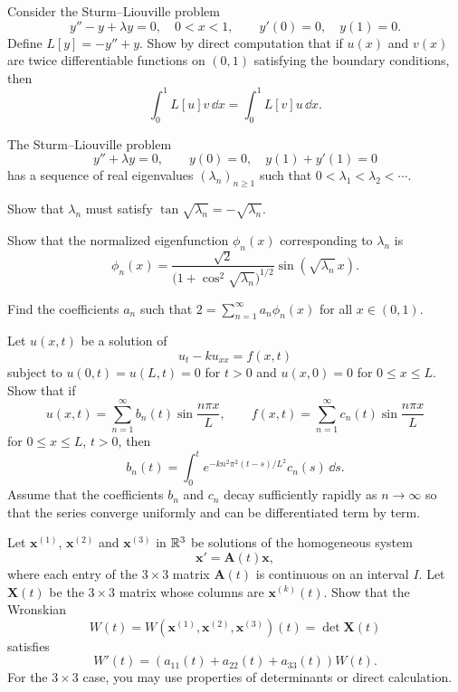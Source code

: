 \documentclass[11pt,oneside]{article}
\begin{document}
\begin{problem}
Consider the Sturm--Liouville problem
\[y''-y+\lambda y=0,\quad 0<x<1,\qquad y'(0)=0,\quad y(1)=0.\]
Define $L[y]=-y''+y$. Show by direct computation that if $u(x)$ and $v(x)$ are twice differentiable functions on $(0,1)$ satisfying the boundary conditions, then
\[\int_0^1 L[u]v\,\dd x=\int_0^1 L[v]u\,\dd x.\]
\end{problem}

\begin{problem}
The Sturm--Liouville problem
\[y''+\lambda y=0,\qquad y(0)=0,\quad y(1)+y'(1)=0\]
has a sequence of real eigenvalues $(\lambda_n)_{n\ge1}$ such that $0<\lambda_1<\lambda_2<\cdots$.
\begin{problemsubparts}
\item Show that $\lambda_n$ must satisfy $\tan\sqrt{\lambda_n}=-\sqrt{\lambda_n}$.
\item Show that the normalized eigenfunction $\phi_n(x)$ corresponding to $\lambda_n$ is
\[\phi_n(x)=\frac{\sqrt2}{\bigl(1+\cos^2\sqrt{\lambda_n}\bigr)^{1/2}}\sin\!\left(\sqrt{\lambda_n}\,x\right).\]
\item Find the coefficients $a_n$ such that $\displaystyle 2=\sum_{n=1}^{\infty}a_n\phi_n(x)$ for all $x\in(0,1)$.
\end{problemsubparts}
\end{problem}

\begin{problem}
Let $u(x,t)$ be a solution of
\[u_t-ku_{xx}=f(x,t)\]
subject to $u(0,t)=u(L,t)=0$ for $t>0$ and $u(x,0)=0$ for $0\le x\le L$. Show that if
\[u(x,t)=\sum_{n=1}^{\infty}b_n(t)\sin\frac{n\pi x}{L},\qquad f(x,t)=\sum_{n=1}^{\infty}c_n(t)\sin\frac{n\pi x}{L}\]
for $0\le x\le L$, $t>0$, then
\[b_n(t)=\int_0^t e^{-kn^2\pi^2(t-s)/L^2}c_n(s)\,\dd s.\]
Assume that the coefficients $b_n$ and $c_n$ decay sufficiently rapidly as $n\to\infty$ so that the series converge uniformly and can be differentiated term by term.
\end{problem}

\begin{problem}
Let $\mathbf x^{(1)}$, $\mathbf x^{(2)}$ and $\mathbf x^{(3)}$ in $\mathbb{R}^3$ be solutions of the homogeneous system
\[\mathbf x'=\mathbf A(t)\mathbf x,\]
where each entry of the $3\times3$ matrix $\mathbf A(t)$ is continuous on an interval $I$. Let $\mathbf X(t)$ be the $3\times3$ matrix whose columns are $\mathbf x^{(k)}(t)$. Show that the Wronskian
\[W(t)=W(\mathbf x^{(1)},\mathbf x^{(2)},\mathbf x^{(3)})(t)=\det\mathbf X(t)\]
satisfies
\[W'(t)=(a_{11}(t)+a_{22}(t)+a_{33}(t))W(t).\]
For the $3\times3$ case, you may use properties of determinants or direct calculation.
\end{problem}
\end{document}
